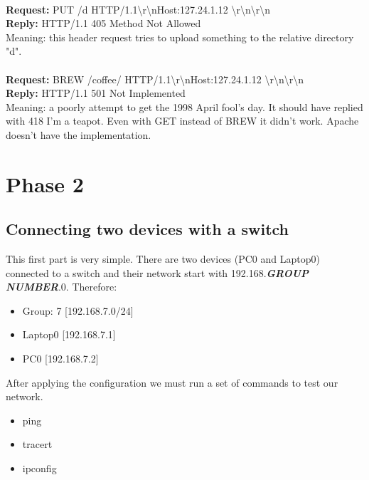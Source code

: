 \documentclass[11pt,a4paper]{report}
\begin{document}
        \\
        \textbf{Request:} PUT /d HTTP/1.1\textbackslash r\textbackslash nHost:127.24.1.12 \textbackslash r\textbackslash n\textbackslash r\textbackslash n \\
        \textbf{Reply:} HTTP/1.1 405 Method Not Allowed \\
        Meaning: this header request tries to upload something to the relative directory "d". \\
        \\
        \textbf{Request:} BREW /coffee/ HTTP/1.1\textbackslash r\textbackslash nHost:127.24.1.12 \textbackslash r\textbackslash n\textbackslash r\textbackslash n \\
        \textbf{Reply:} HTTP/1.1 501 Not Implemented \\
        Meaning: a poorly attempt to get the 1998 April fool's day. It should have replied with 418 I'm a teapot. Even with GET instead of BREW it didn't work. Apache doesn't have the implementation. \\

\chapter{Phase 2}
    \section{Connecting two devices with a switch}
        This first part is very simple. There are two devices (PC0 and Laptop0) connected to a switch and their network start with 192.168.\textbf{\textit{GROUP NUMBER}}.0.
        Therefore:

        \begin{itemize}
            \item Group: 7 [192.168.7.0/24]
            \item Laptop0  [192.168.7.1]
            \item PC0      [192.168.7.2]
        \end{itemize}

        After applying the configuration we must run a set of commands to test our network.
        \begin{itemize}
            \item ping
            \item tracert
            \item ipconfig
        \end{itemize}
\end{document}
